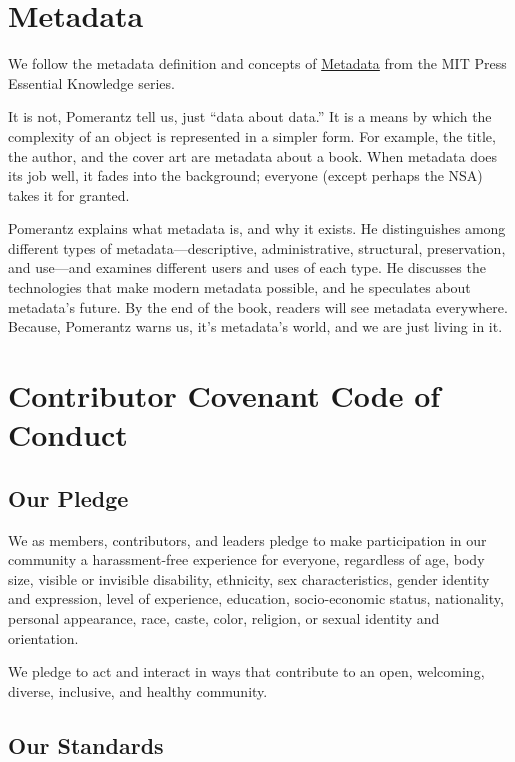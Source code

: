 \documentclass[
  fontsize=13pt,
  english,
  a4paper,
  openany, a4paper, oneside]{book}
\begin{document}
\hypertarget{metadata}{%
\chapter{Metadata}\label{metadata}}

We follow the metadata definition and concepts of \href{https://mitpress.mit.edu/books/metadata}{Metadata} from the MIT Press Essential Knowledge series.

It is not, Pomerantz tell us, just ``data about data.'' It is a means by which the complexity of an object is represented in a simpler form. For example, the title, the author, and the cover art are metadata about a book. When metadata does its job well, it fades into the background; everyone (except perhaps the NSA) takes it for granted.

Pomerantz explains what metadata is, and why it exists. He distinguishes among different types of metadata---descriptive, administrative, structural, preservation, and use---and examines different users and uses of each type. He discusses the technologies that make modern metadata possible, and he speculates about metadata's future. By the end of the book, readers will see metadata everywhere. Because, Pomerantz warns us, it's metadata's world, and we are just living in it.

\hypertarget{covenant}{%
\chapter{Contributor Covenant Code of Conduct}\label{covenant}}

\hypertarget{our-pledge}{%
\section{Our Pledge}\label{our-pledge}}

We as members, contributors, and leaders pledge to make participation in our
community a harassment-free experience for everyone, regardless of age, body
size, visible or invisible disability, ethnicity, sex characteristics, gender
identity and expression, level of experience, education, socio-economic status,
nationality, personal appearance, race, caste, color, religion, or sexual identity and orientation.

We pledge to act and interact in ways that contribute to an open, welcoming,
diverse, inclusive, and healthy community.

\hypertarget{our-standards}{%
\section{Our Standards}\label{our-standards}}
\end{document}
